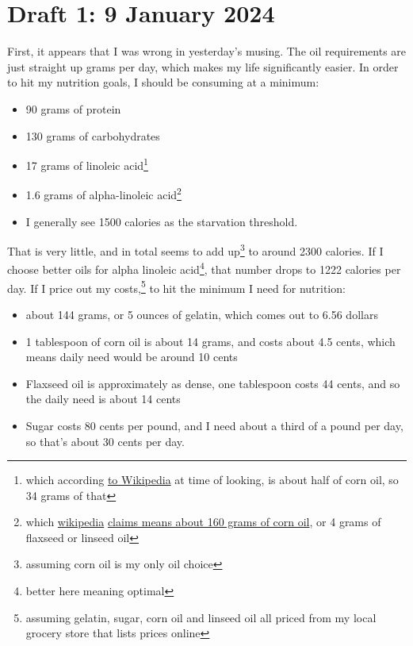 \documentclass[12pt]{article}[titlepage]
\renewcommand{\,}{\textsuperscript{,}}
\begin{document}
\section{Draft 1: 9 January 2024}

First, it appears that I was wrong in yesterday's musing. The oil requirements are just straight up grams per day, which makes my life significantly easier.  
In order to hit my nutrition goals, I should be consuming at a minimum:

\begin{itemize}  
\item 90 grams of protein  
\item 130 grams of carbohydrates  
\item 17 grams of linoleic acid\footnote{which according \href{https://en.wikipedia.org/wiki/Linoleic\_acid}{to Wikipedia} at time of looking, is about half of corn oil, so 34 grams of that}  
\item 1.6 grams of alpha-linoleic acid\footnote{which \href{https://en.wikipedia.org/wiki/\%CE\%91-Linolenic\_acid}{wikipedia} \href{https://en.wikipedia.org/wiki/Vegetable\_oil\#Composition\_of\_fats}{claims means about 160 grams of corn oil}, or 4 grams of flaxseed or linseed oil}  
\item I generally see 1500 calories as the starvation threshold.  
\end{itemize}

That is very little, and in total seems to add up\footnote{assuming corn oil is my only oil choice} to around 2300 calories. If I choose better oils for alpha linoleic acid\footnote{better here meaning optimal}, that number drops to 1222 calories per day.  
If I price out my costs,\footnote{assuming gelatin, sugar, corn oil and linseed oil all priced from my local grocery store that lists prices online} to hit the minimum I need for nutrition:

\begin{itemize}  
\item about 144 grams, or 5 ounces of gelatin, which comes out to 6.56 dollars  
\item 1 tablespoon of corn oil is about 14 grams, and costs about 4.5 cents, which means daily need would be around 10 cents  
\item Flaxseed oil is approximately as dense, one tablespoon costs 44 cents, and so the daily need is about 14 cents  
\item Sugar costs 80 cents per pound, and I need about a third of a pound per day, so that's about 30 cents per day.  
\end{itemize}
\end{document}
